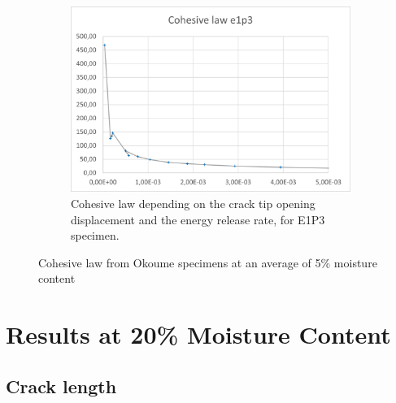 \begin{figure}[H]
\begin{subfigure}{0.48\linewidth}
		\includegraphics[scale=0.6]{Figures/e1p3_colaw}
		\decoRule
		\caption[Cohesive law from E1P3 specimen]{Cohesive law depending on the crack tip opening displacement and the energy release rate, for E1P3 specimen.}
		\label{fig:E1P3_colaw}
	\end{subfigure}
	\caption{Cohesive law from Okoume specimens at an average of 5\% moisture content}
	\label{E1p_colaw}
\end{figure}
\newpage

\section{Results at 20\% Moisture Content}

\subsection{Crack length}

